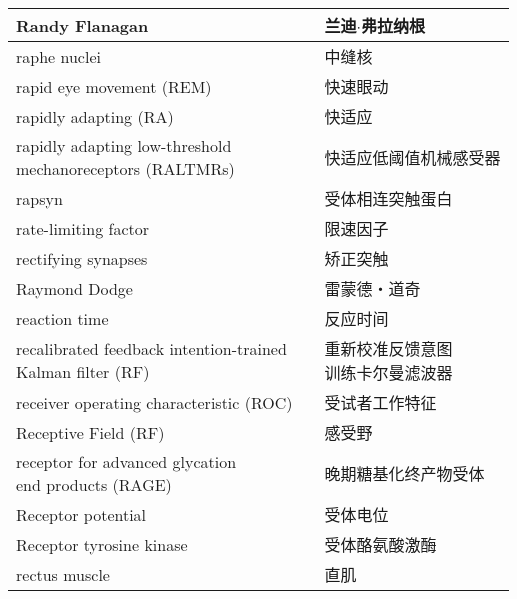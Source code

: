 \begin{longtable}{lll}
	\midrule
	Randy Flanagan   && 兰迪$\cdot$弗拉纳根  \\
	
	\midrule
	raphe nuclei   && 中缝核  \\
	
	\midrule
	rapid eye movement (REM)   && 快速眼动  \\
	
	\midrule
	rapidly adapting (RA)   && 快适应  \\
	
	\midrule
	\makecell[l]{rapidly adapting low-threshold\\ mechanoreceptors (RALTMRs)}  && 快适应低阈值机械感受器  \\
	
	\midrule
	rapsyn  && 受体相连突触蛋白  \\
	
	\midrule
	rate-limiting factor  && 限速因子  \\
	
	\midrule
	rectifying synapses  && 矫正突触  \\
	
	\midrule
	Raymond Dodge  && 雷蒙德・道奇  \\
	
	\midrule
	reaction time  && 反应时间  \\
	
	\midrule
	\makecell[l]{recalibrated feedback intention-trained\\ Kalman filter (RF)}   && \makecell[l]{重新校准反馈意图\\训练卡尔曼滤波器}  \\
	
	\midrule
	receiver operating characteristic (ROC)   && 受试者工作特征  \\
	
	\midrule
	Receptive Field (RF)   && 感受野  \\
	
	\midrule
	\makecell[l]{receptor for advanced glycation \\end products (RAGE)}   && 晚期糖基化终产物受体  \\
	
	\midrule
	Receptor potential   && 受体电位  \\
	
	\midrule
	Receptor tyrosine kinase   && 受体酪氨酸激酶  \\
	
	\midrule
	rectus muscle   && 直肌  \\
	

\end{longtable}
